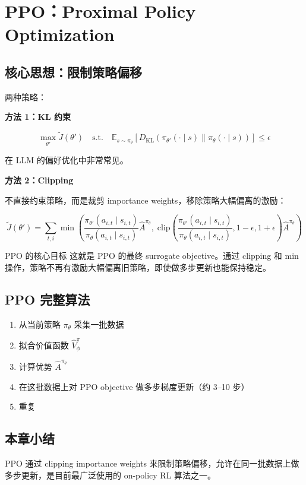 \section{PPO：Proximal Policy Optimization}

\subsection{核心思想：限制策略偏移}

两种策略：

\textbf{方法 1：KL 约束}

$$\max_{\theta'} \tilde{J}(\theta') \quad \text{s.t.} \quad \mathbb{E}_{s \sim \pi_\theta}\left[D_{\mathrm{KL}}\left(\pi_{\theta'}(\cdot \mid s) \| \pi_\theta(\cdot \mid s)\right)\right] \leq \epsilon$$

在 LLM 的偏好优化中非常常见。

\textbf{方法 2：Clipping}

不直接约束策略，而是裁剪 importance weights，移除策略大幅偏离的激励：

$$\tilde{J}(\theta') = \sum_{t,i} \min\left(\frac{\pi_{\theta'}(a_{i,t} \mid s_{i,t})}{\pi_\theta(a_{i,t} \mid s_{i,t})} \hat{A}^{\pi_\theta}, \; \mathrm{clip}\left(\frac{\pi_{\theta'}(a_{i,t} \mid s_{i,t})}{\pi_\theta(a_{i,t} \mid s_{i,t})}, 1-\epsilon, 1+\epsilon\right) \hat{A}^{\pi_\theta}\right)$$

\begin{importantbox}{PPO 的核心目标}
这就是 PPO 的最终 surrogate objective。通过 clipping 和 min 操作，策略不再有激励大幅偏离旧策略，即使做多步更新也能保持稳定。
\end{importantbox}

\subsection{PPO 完整算法}

\begin{enumerate}
    \item 从当前策略 $\pi_\theta$ 采集一批数据
    \item 拟合价值函数 $\hat{V}^\pi_\phi$
    \item 计算优势 $\hat{A}^{\pi_\theta}$
    \item 在这批数据上对 PPO objective 做多步梯度更新（约 3--10 步）
    \item 重复
\end{enumerate}

\subsection{本章小结}

PPO 通过 clipping importance weights 来限制策略偏移，允许在同一批数据上做多步更新，是目前最广泛使用的 on-policy RL 算法之一。

